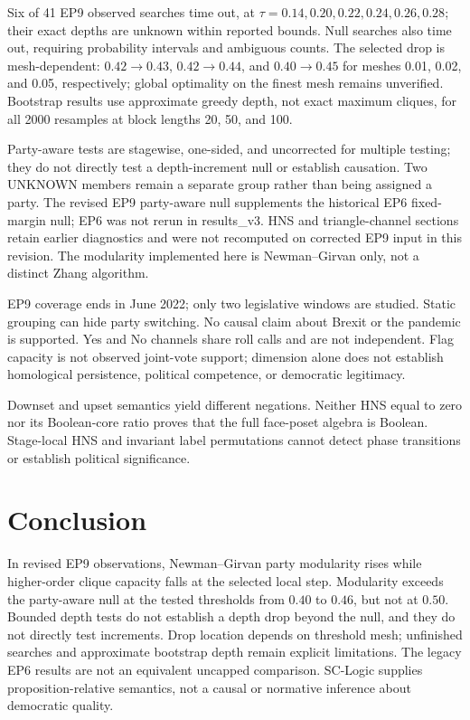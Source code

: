 \documentclass[a4paper,fleqn,oneside]{cas-sc}
\theoremstyle{definition}
\theoremstyle{plain}
\begin{document}
Six of 41 EP9 observed searches time out, at $\tau=0.14,0.20,0.22,0.24,0.26,0.28$; their exact depths are unknown within reported bounds. Null searches also time out, requiring probability intervals and ambiguous counts. The selected drop is mesh-dependent: $0.42\to0.43$, $0.42\to0.44$, and $0.40\to0.45$ for meshes 0.01, 0.02, and 0.05, respectively; global optimality on the finest mesh remains unverified. Bootstrap results use approximate greedy depth, not exact maximum cliques, for all 2000 resamples at block lengths 20, 50, and 100.

Party-aware tests are stagewise, one-sided, and uncorrected for multiple testing; they do not directly test a depth-increment null or establish causation. Two UNKNOWN members remain a separate group rather than being assigned a party. The revised EP9 party-aware null supplements the historical EP6 fixed-margin null; EP6 was not rerun in results\_v3. HNS and triangle-channel sections retain earlier diagnostics and were not recomputed on corrected EP9 input in this revision. The modularity implemented here is Newman--Girvan only, not a distinct Zhang algorithm.

EP9 coverage ends in June 2022; only two legislative windows are studied. Static grouping can hide party switching. No causal claim about Brexit or the pandemic is supported. Yes and No channels share roll calls and are not independent. Flag capacity is not observed joint-vote support; dimension alone does not establish homological persistence, political competence, or democratic legitimacy.

Downset and upset semantics yield different negations. Neither HNS equal to zero nor its Boolean-core ratio proves that the full face-poset algebra is Boolean. Stage-local HNS and invariant label permutations cannot detect phase transitions or establish political significance.

\section{Conclusion}\label{sec:conclusion}
In revised EP9 observations, Newman--Girvan party modularity rises while higher-order clique capacity falls at the selected local step. Modularity exceeds the party-aware null at the tested thresholds from $0.40$ to $0.46$, but not at $0.50$. Bounded depth tests do not establish a depth drop beyond the null, and they do not directly test increments. Drop location depends on threshold mesh; unfinished searches and approximate bootstrap depth remain explicit limitations. The legacy EP6 results are not an equivalent uncapped comparison. SC-Logic supplies proposition-relative semantics, not a causal or normative inference about democratic quality.
\end{document}
